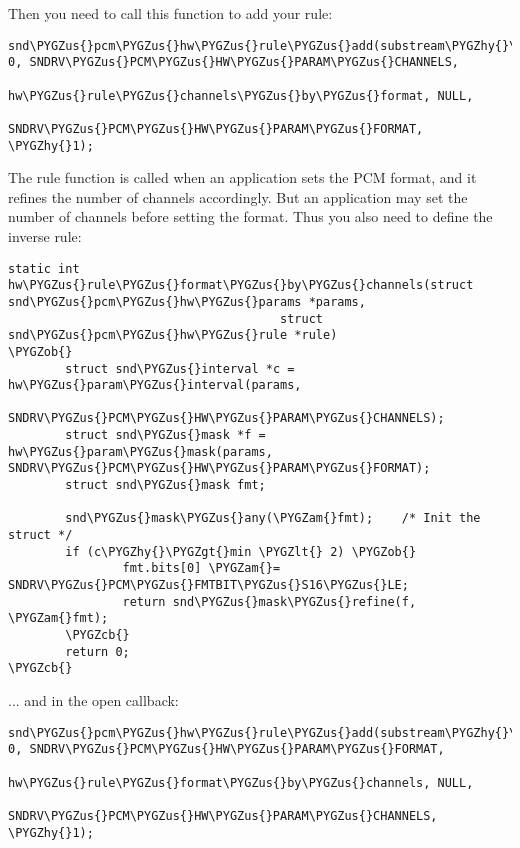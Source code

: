 \documentclass[a4paper,8pt,english]{sphinxmanual}
\def\PYGZus{\char`\_}
\def\PYGZob{\char`\{}
\def\PYGZcb{\char`\}}
\def\PYGZam{\char`\&}
\def\PYGZlt{\char`\<}
\def\PYGZgt{\char`\>}
\def\PYGZhy{\char`\-}
\begin{document}
Then you need to call this function to add your rule:

\begin{Verbatim}[commandchars=\\\{\}]
snd\PYGZus{}pcm\PYGZus{}hw\PYGZus{}rule\PYGZus{}add(substream\PYGZhy{}\PYGZgt{}runtime, 0, SNDRV\PYGZus{}PCM\PYGZus{}HW\PYGZus{}PARAM\PYGZus{}CHANNELS,
                    hw\PYGZus{}rule\PYGZus{}channels\PYGZus{}by\PYGZus{}format, NULL,
                    SNDRV\PYGZus{}PCM\PYGZus{}HW\PYGZus{}PARAM\PYGZus{}FORMAT, \PYGZhy{}1);
\end{Verbatim}

The rule function is called when an application sets the PCM format, and
it refines the number of channels accordingly. But an application may
set the number of channels before setting the format. Thus you also need
to define the inverse rule:

\begin{Verbatim}[commandchars=\\\{\}]
static int hw\PYGZus{}rule\PYGZus{}format\PYGZus{}by\PYGZus{}channels(struct snd\PYGZus{}pcm\PYGZus{}hw\PYGZus{}params *params,
                                      struct snd\PYGZus{}pcm\PYGZus{}hw\PYGZus{}rule *rule)
\PYGZob{}
        struct snd\PYGZus{}interval *c = hw\PYGZus{}param\PYGZus{}interval(params,
              SNDRV\PYGZus{}PCM\PYGZus{}HW\PYGZus{}PARAM\PYGZus{}CHANNELS);
        struct snd\PYGZus{}mask *f = hw\PYGZus{}param\PYGZus{}mask(params, SNDRV\PYGZus{}PCM\PYGZus{}HW\PYGZus{}PARAM\PYGZus{}FORMAT);
        struct snd\PYGZus{}mask fmt;

        snd\PYGZus{}mask\PYGZus{}any(\PYGZam{}fmt);    /* Init the struct */
        if (c\PYGZhy{}\PYGZgt{}min \PYGZlt{} 2) \PYGZob{}
                fmt.bits[0] \PYGZam{}= SNDRV\PYGZus{}PCM\PYGZus{}FMTBIT\PYGZus{}S16\PYGZus{}LE;
                return snd\PYGZus{}mask\PYGZus{}refine(f, \PYGZam{}fmt);
        \PYGZcb{}
        return 0;
\PYGZcb{}
\end{Verbatim}

... and in the open callback:

\begin{Verbatim}[commandchars=\\\{\}]
snd\PYGZus{}pcm\PYGZus{}hw\PYGZus{}rule\PYGZus{}add(substream\PYGZhy{}\PYGZgt{}runtime, 0, SNDRV\PYGZus{}PCM\PYGZus{}HW\PYGZus{}PARAM\PYGZus{}FORMAT,
                    hw\PYGZus{}rule\PYGZus{}format\PYGZus{}by\PYGZus{}channels, NULL,
                    SNDRV\PYGZus{}PCM\PYGZus{}HW\PYGZus{}PARAM\PYGZus{}CHANNELS, \PYGZhy{}1);
\end{Verbatim}
\end{document}
